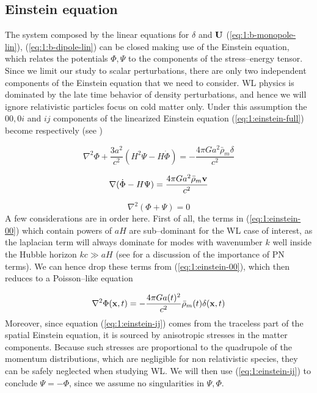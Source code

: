 \subsection{Einstein equation}
The system composed by the linear equations for $\delta$ and $\mathbf{U}$ (\ref{eq:1:b-monopole-lin}), (\ref{eq:1:b-dipole-lin}) can be closed making use of the Einstein equation, which relates the potentials $\Phi,\Psi$ to the components of the stress--energy tensor. Since we limit our study to scalar perturbations, there are only two independent components of the Einstein equation that we need to consider. WL physics is dominated by the late time behavior of density perturbations, and hence we will ignore relativistic particles focus on cold matter only. Under this assumption the $00,0i$ and $ij$ components of the linearized Einstein equation (\ref{eq:1:einstein-full}) become respectively (see \citep{Dodelson-C5})

\begin{equation}
\label{eq:1:einstein-00}
\nabla^2\Phi +\frac{3a^2}{c^2}(H^2\Psi-H\dot{\Phi}) = -\frac{4\pi Ga^2\bar{\rho}_m\delta}{c^2}
\end{equation}

\begin{equation}
\label{eq:1:einstein-0i}
\nabla(\dot{\Phi}-H\Psi) = \frac{4\pi Ga^2\bar{\rho}_m\mathbf{v}}{c^2}
\end{equation}

\begin{equation}
\label{eq:1:einstein-ij}
\nabla^2(\Phi+\Psi) = 0
\end{equation}
%
A few considerations are in order here. First of all, the terms in (\ref{eq:1:einstein-00}) which contain powers of $aH$ are sub--dominant for the WL case of interest, as the laplacian term will always dominate for modes with wavenumber $k$ well inside the Hubble horizon $kc\gg aH$ (see \citep{PNLensing} for a discussion of the importance of PN terms). We can hence drop these terms from (\ref{eq:1:einstein-00}), which then reduces to a Poisson--like equation 

\begin{equation}
\label{eq:1:poisson}
\nabla^2\Phi(\mathbf{x},t) = -\frac{4\pi Ga(t)^2}{c^2}\bar{\rho}_m(t)\delta(\mathbf{x},t)
\end{equation}
%
Moreover, since equation (\ref{eq:1:einstein-ij}) comes from the traceless part of the spatial Einstein equation, it is sourced by anisotropic stresses in the matter components. Because such stresses are proportional to the quadrupole of the momentum distributions, which are negligible for non relativistic species, they can be safely neglected when studying WL. We will then use (\ref{eq:1:einstein-ij}) to conclude $\Psi=-\Phi$, since we assume no singularities in $\Psi,\Phi$.  

